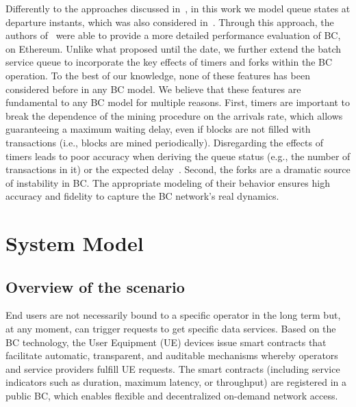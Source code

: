 \documentclass[conference]{IEEEtran}
\theoremstyle{definition}
\begin{document}
Differently to the approaches discussed in~\cite{kawase2017transaction, kawase2018batch,li2018blockchain,li2019markov}, in this work we model queue states at departure instants, which was also considered in~\cite{geissler2019discrete}. Through this approach, the authors of~\cite{geissler2019discrete} were able to provide a more detailed performance evaluation of BC, on Ethereum. Unlike what proposed until the date, we further extend the batch service queue to incorporate the key effects of timers and forks within the BC operation. To the best of our knowledge, none of these features has been considered before in any BC model. We believe that these features are fundamental to any BC model for multiple reasons. First, timers are important to break the dependence of the mining procedure on the arrivals rate, which allows guaranteeing a maximum waiting delay, even if blocks are not filled with transactions (i.e., blocks are mined periodically). Disregarding the effects of timers leads to poor accuracy when deriving the queue status (e.g., the number of transactions in it) or the expected delay~\cite{claeys2013tail}. Second, the forks are a dramatic source of instability in BC. The appropriate modeling of their behavior ensures high accuracy and fidelity to capture the BC network's real dynamics. %

\section{System Model}
\label{section:system_model}
\subsection{Overview of the scenario}
End users are not necessarily bound to a specific operator in the long term but, at any moment, can trigger requests to get specific data services. Based on the BC technology, the User Equipment (UE) devices issue smart contracts that facilitate automatic, transparent, and auditable mechanisms whereby operators and service providers fulfill UE requests. The smart contracts (including service indicators such as duration, maximum latency, or throughput) are registered in a public BC, which enables flexible and decentralized on-demand network access. 

\end{document}
